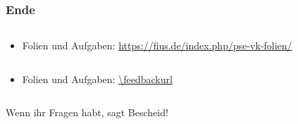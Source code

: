 \begin{frame}[fragile]
    \frametitle{Ende}
    \begin{columns}
        \begin{column}{0.65\textwidth}
            \begin{itemize}
                \item Folien und Aufgaben: \newline \url{https://fius.de/index.php/pse-vk-folien/}
            \end{itemize}
        \end{column}
        \begin{column}{0.35\textwidth}
        \end{column}
    \end{columns}

    \vspace{3em}

    \begin{columns}
        \begin{column}{0.65\textwidth}
            \begin{itemize}
                \item Folien und Aufgaben: \newline \url{\feedbackurl}
            \end{itemize}
        \end{column}
        \begin{column}{0.35\textwidth}
            \qrcode{\feedbackurl}
        \end{column}
    \end{columns}

    Wenn ihr Fragen habt, sagt Bescheid!

\end{frame}